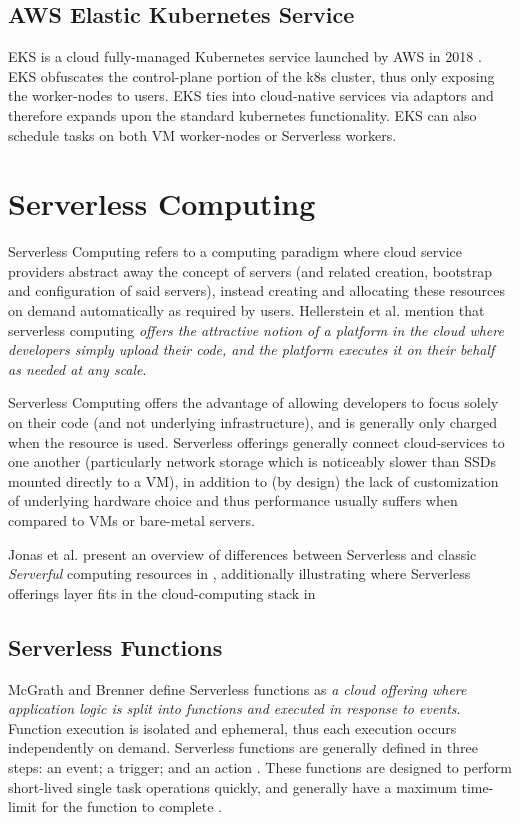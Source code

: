\subsection{AWS Elastic Kubernetes Service}
EKS is a cloud fully-managed Kubernetes service launched by AWS in 2018 \cite{eks}. 
EKS obfuscates the control-plane portion of the k8s cluster, thus only exposing the worker-nodes to users.
EKS ties into cloud-native services via adaptors and therefore expands upon the standard kubernetes functionality.
EKS can also schedule tasks on both VM worker-nodes or Serverless workers\cite{hansen_2022}. 

\section{Serverless Computing}

Serverless Computing refers to a computing paradigm where cloud service providers abstract away the concept of servers (and related creation, bootstrap and configuration of said servers),
instead creating and allocating these resources on demand automatically as required by users. Hellerstein et al. mention that serverless computing 
\textit{offers the attractive notion of a platform in the cloud where developers simply upload their code, and the platform executes it on their behalf as needed at any scale}\cite{hellerstein2018serverless}.

Serverless Computing offers the advantage of allowing developers to focus solely on their code (and not underlying infrastructure), and is generally only charged when the resource is used\cite{jonas2019cloud}.
Serverless offerings generally connect cloud-services to one another (particularly network storage which is noticeably slower than SSDs mounted directly to a VM), 
in addition to (by design) the lack of customization of underlying hardware choice and thus performance usually suffers when compared to VMs or bare-metal servers\cite{hellerstein2018serverlessdisadvantages}.

Jonas et al. present an overview of differences between Serverless and classic \emph{Serverful} computing resources in \cite[Table 2]{jonas2019cloud}, 
additionally illustrating where Serverless offerings layer fits in the cloud-computing stack in \cite[Figure 1]{jonas2019cloud}

\subsection{Serverless Functions}
McGrath and Brenner define Serverless functions as \textit{a cloud offering where application logic is split into functions and
executed in response to events}\cite{mcgrath2017serverless}. 
Function execution is isolated and ephemeral, thus each execution occurs independently on demand.
Serverless functions are generally defined in three steps: an event; a trigger; and an action \cite{baldini2016cloud}. 
These functions are designed to perform short-lived single task operations quickly, and generally have a maximum time-limit for the function to complete \cite{hellerstein2018serverlessdisadvantages}.


